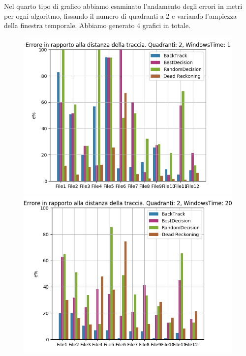 \documentclass[12pt,a4paper,openright,twoside]{report}
\begin{document}
Nel quarto tipo di grafico abbiamo esaminato l'andamento degli errori in metri per ogni algoritmo, fissando il numero di quadranti a 2 e variando l'ampiezza della finestra temporale. Abbiamo generato 4 grafici in totale.

\begin{figure}[H]
\centering 
\includegraphics[scale=0.4]{firstChart2-1} 
\includegraphics[scale=0.4]{firstChart2-20} 
\end{figure}
\end{document}
